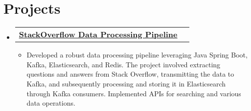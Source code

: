 \documentclass[letterpaper,10.8pt]{article}
\makeatletter
\newcommand{\resumeSubheadingProject}[2]{
  \vspace{-1pt}\item
    \begin{tabular*}{0.97\textwidth}{l@{\extracolsep{\fill}}r}
      \textbf{#1} & #2 \\
    \end{tabular*}\vspace{-5pt}
}
\newcommand{\resumeSubHeadingListStart}{\begin{itemize}[leftmargin=*]}
\newcommand{\resumeSubHeadingListEnd}{\end{itemize}}
\makeatother
\begin{document}
\section{Projects}
  \resumeSubHeadingListStart
  \resumeSubheadingProject
    {\href{}{StackOverflow Data Processing Pipeline}}{}		\begin{itemize}[itemsep=0pt]
		\item   Developed a robust data processing pipeline leveraging Java Spring Boot, Kafka, Elasticsearch, and Redis. The project involved extracting questions and answers from Stack Overflow, transmitting the data to Kafka, and subsequently processing and storing it in Elasticsearch through Kafka consumers. Implemented APIs for searching and various data operations.
	\end{itemize}
\resumeSubHeadingListEnd
\end{document}
